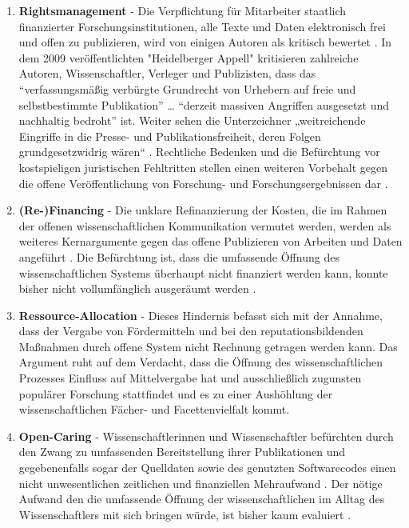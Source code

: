 \begin{enumerate}
\item \textbf{Rightsmanagement} - Die Verpflichtung für Mitarbeiter staatlich finanzierter Forschungsinstitutionen, alle Texte und Daten elektronisch frei und offen zu publizieren, wird von einigen Autoren als kritisch bewertet \cite{suchen}. In dem 2009 veröffentlichten "Heidelberger Appell" \cite{faz_heidelberger_apell_2009} kritisieren zahlreiche Autoren, Wissenschaftler, Verleger und Publizisten, dass das “verfassungsmäßig verbürgte Grundrecht von Urhebern auf freie und selbstbestimmte Publikation” … “derzeit massiven Angriffen ausgesetzt und nachhaltig bedroht” ist. Weiter sehen die Unterzeichner „weitreichende Eingriffe in die Presse- und Publikationsfreiheit, deren Folgen grundgesetzwidrig wären“ \cite{ITK_2009}. Rechtliche Bedenken und die Befürchtung vor kostspieligen juristischen Fehltritten stellen einen weiteren Vorbehalt gegen die offene Veröffentlichung von Forschung- und Forschungsergebnissen dar \cite{weishaupt_2009_goldenOA}.
\item \textbf{(Re-)Financing} - Die unklare Refinanzierung der Kosten, die im Rahmen der offenen wissenschaftlichen Kommunikation vermutet werden, werden als weiteres Kernargumente gegen das offene Publizieren von Arbeiten und Daten angeführt \cite{Chibnik_2015}. Die Befürchtung ist, dass die umfassende Öffnung des wissenschaftlichen Systems überhaupt nicht finanziert werden kann, konnte bisher nicht vollumfänglich ausgeräumt werden \cite{weishaupt_2009_goldenOA}.
\item \textbf{Ressource-Allocation} - Dieses Hindernis befasst sich mit der Annahme, dass der Vergabe von Fördermitteln und bei den reputationsbildenden Maßnahmen durch offene System nicht Rechnung getragen werden kann. Das Argument ruht auf dem Verdacht, dass die Öffnung des wissenschaftlichen Prozesses Einfluss auf Mittelvergabe hat \cite{grand_2012_open} und ausschließlich zugunsten populärer Forschung stattfindet und es zu einer Aushöhlung der wissenschaftlichen Fächer- und Facettenvielfalt kommt.
\item \textbf{Open-Caring} - Wissenschaftlerinnen und Wissenschaftler befürchten durch den Zwang zu umfassenden Bereitstellung ihrer Publikationen und gegebenenfalls sogar der Quelldaten sowie des genutzten Softwarecodes einen nicht unwesentlichen zeitlichen und finanziellen Mehraufwand \cite{bbaw_publizieren_2015} \cite{mennes_2013_making_os} \cite{grand_2012_open}. Der nötige Aufwand den die umfassende Öffnung der wissenschaftlichen im Alltag des Wissenschaftlers mit sich bringen würde, ist bisher kaum evaluiert \cite{osterloh2008anreize}.

\end{enumerate}
